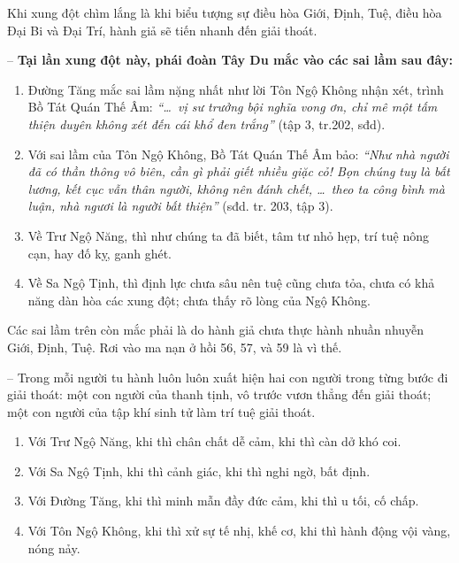 Khi xung đột chìm lắng là khi biểu tượng sự điều hòa Giới, Định, Tuệ, điều hòa Đại Bi và Đại Trí, hành giả sẽ tiến nhanh đến giải thoát.

-- {\bf Tại lần xung đột này, phái đoàn Tây Du mắc vào các sai lầm sau đây:}

\begin{enumerate}[label=\itshape\alph*\upshape/]
    \item Đường Tăng mắc sai lầm nặng nhất như lời Tôn Ngộ Không nhận xét, trình Bồ Tát Quán Thế Âm: \emph{``\ldots ~vị sư trưởng bội nghĩa vong ơn, chỉ mê một tấm thiện duyên không xét đến cái khổ đen trắng''} (tập 3, tr.202, sđd).

    \item Với sai lầm của Tôn Ngộ Không, Bồ Tát Quán Thế Âm bảo: \emph{``Như nhà người đã có thần thông vô biên, cần gì phải giết nhiều giặc cỏ! Bọn chúng tuy là bất lương, kết cục vẫn thân người, không nên đánh chết, \ldots ~theo ta công bình mà luận, nhà ngươi là người bất thiện''} (sđd. tr. 203, tập 3).

    \item Về Trư Ngộ Năng, thì như chúng ta đã biết, tâm tư nhỏ hẹp, trí tuệ nông cạn, hay đố kỵ, ganh ghét.

    \item Về Sa Ngộ Tịnh, thì định lực chưa sâu nên tuệ cũng chưa tỏa, chưa có khả năng dàn hòa các xung đột; chưa thấy rõ lòng của Ngộ Không.
\end{enumerate}

Các sai lầm trên còn mắc phải là do hành giả chưa thực hành nhuần nhuyễn Giới, Định, Tuệ. Rơi vào ma nạn ở hồi 56, 57, và 59 là vì thế.

-- Trong mỗi người tu hành luôn luôn xuất hiện hai con người trong từng bước đi giải thoát: một con người của thanh tịnh, vô trước vươn thẳng đến giải thoát; một con người của tập khí sinh tử làm trí tuệ giải thoát.

\begin{enumerate}[label=\itshape\alph*\upshape/]
    \item Với Trư Ngộ Năng, khi thì chân chất dễ cảm, khi thì càn dở khó coi.

    \item Với Sa Ngộ Tịnh, khi thì cảnh giác, khi thì nghi ngờ, bất định.

    \item Với Đường Tăng, khi thì minh mẫn đầy đức cảm, khi thì u tối, cố chấp.

    \item Với Tôn Ngộ Không, khi thì xử sự tế nhị, khế cơ, khi thì hành động vội vàng, nóng nảy.
\end{enumerate}

